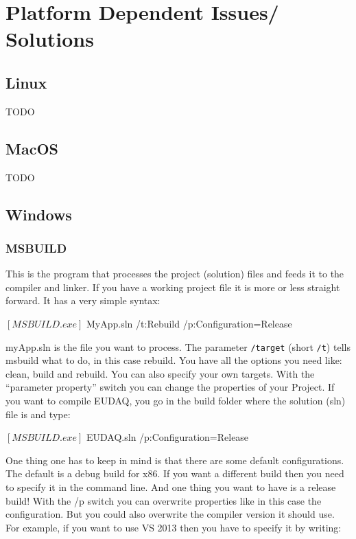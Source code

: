 \section{Platform Dependent Issues/ Solutions}
\label{app:platform}
\subsection{Linux}
TODO
\subsection{MacOS}
TODO
\subsection{Windows}
\subsubsection{MSBUILD}

This is the program that processes the project (solution) files and feeds it to the compiler and linker. If you have a working project file it is more or less straight forward. It has a very simple syntax:

      \begin{listing}[mybash]
$[MSBUILD.exe]$ MyApp.sln /t:Rebuild /p:Configuration=Release
\end{listing}

myApp.sln is the file you want to process. The parameter
\texttt{/target} (short \texttt{/t}) tells msbuild what to do, in this
case rebuild. You have all the options you need like: clean, build and
rebuild. You can also specify your own targets. With the ``parameter
property'' switch you can change the properties of your Project. If you want to compile EUDAQ, you go in the build folder where the solution (sln) file is and type:

      \begin{listing}[mybash]
$[MSBUILD.exe]$ EUDAQ.sln /p:Configuration=Release 
\end{listing}

One thing one has to keep in mind is that there are some default
configurations. The default is a debug build for x86. If you want a
different build then you need to specify it in the command line. And
one thing you want to have is a release build! With the /p switch you
can overwrite properties like in this case the configuration. But you
could also overwrite the compiler version it should use. For example, if you
want to use VS 2013 then you have to specify it by writing:

